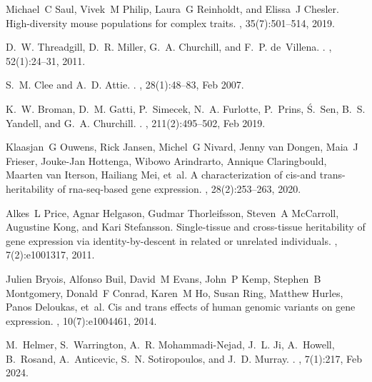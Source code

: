 \documentclass[
]{article}
\begin{document}
\begin{thebibliography}{100}
Michael~C Saul, Vivek~M Philip, Laura~G Reinholdt, and Elissa~J Chesler.
\newblock High-diversity mouse populations for complex traits.
, 35(7):501--514, 2019.

D.~W. Threadgill, D.~R. Miller, G.~A. Churchill, and F.~P. de~Villena.
.
, 52(1):24--31, 2011.

S.~M. Clee and A.~D. Attie.
.
, 28(1):48--83, Feb 2007.

K.~W. Broman, D.~M. Gatti, P.~Simecek, N.~A. Furlotte, P.~Prins, {\'S}.~Sen,
  B.~S. Yandell, and G.~A. Churchill.
.
, 211(2):495--502, Feb 2019.

Klaasjan~G Ouwens, Rick Jansen, Michel~G Nivard, Jenny van Dongen, Maia~J
  Frieser, Jouke-Jan Hottenga, Wibowo Arindrarto, Annique Claringbould, Maarten
  van Iterson, Hailiang Mei, et~al.
\newblock A characterization of cis-and trans-heritability of rna-seq-based
  gene expression.
, 28(2):253--263, 2020.

Alkes~L Price, Agnar Helgason, Gudmar Thorleifsson, Steven~A McCarroll,
  Augustine Kong, and Kari Stefansson.
\newblock Single-tissue and cross-tissue heritability of gene expression via
  identity-by-descent in related or unrelated individuals.
, 7(2):e1001317, 2011.

Julien Bryois, Alfonso Buil, David~M Evans, John~P Kemp, Stephen~B Montgomery,
  Donald~F Conrad, Karen~M Ho, Susan Ring, Matthew Hurles, Panos Deloukas,
  et~al.
\newblock Cis and trans effects of human genomic variants on gene expression.
, 10(7):e1004461, 2014.

M.~Helmer, S.~Warrington, A.~R. Mohammadi-Nejad, J.~L. Ji, A.~Howell,
  B.~Rosand, A.~Anticevic, S.~N. Sotiropoulos, and J.~D. Murray.
.
, 7(1):217, Feb 2024.


\end{thebibliography}
\end{document}
